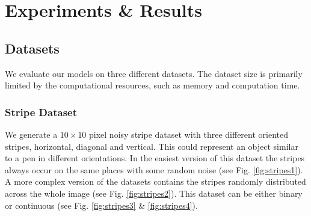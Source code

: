 \chapter{Experiments \& Results} \label{c:expres}

\section{Datasets} \label{c:datasets}
 
We evaluate our models on three different datasets.
The dataset size is primarily limited by the computational resources, such as memory and computation time. 

\subsection{Stripe Dataset} \label{c:stripes}

We generate a $10 \times 10$ pixel noisy stripe dataset with three different oriented stripes, horizontal, diagonal and vertical. 
This could represent an object similar to a pen in different orientations.
In the easiest version of this dataset the stripes always occur on the same places with some random noise (see Fig. \ref{fig:stripes1}).
A more complex version of the datasets contains the stripes randomly distributed across the whole image (see Fig. \ref{fig:stripes2}).
This dataset can be either binary or continuous (see Fig. \ref{fig:stripes3} \& \ref{fig:stripes4}).


